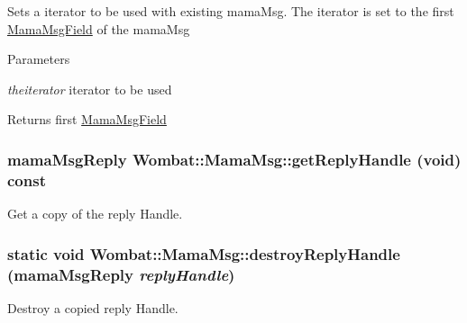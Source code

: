 Sets a iterator to be used with existing mamaMsg. The iterator is set to the first \hyperlink{classWombat_1_1MamaMsgField}{MamaMsgField} of the mamaMsg


\begin{DoxyParams}{Parameters}
\item[{\em theiterator}]iterator to be used \end{DoxyParams}
\begin{DoxyReturn}{Returns}
first \hyperlink{classWombat_1_1MamaMsgField}{MamaMsgField} 
\end{DoxyReturn}
\hypertarget{classWombat_1_1MamaMsg_a27a619720f5b52b966239d02cabf63b0}{
\subsubsection[{getReplyHandle}]{\setlength{\rightskip}{0pt plus 5cm}mamaMsgReply Wombat::MamaMsg::getReplyHandle (void) const}}
\label{classWombat_1_1MamaMsg_a27a619720f5b52b966239d02cabf63b0}


Get a copy of the reply Handle. \hypertarget{classWombat_1_1MamaMsg_ae57b68a19d23621e6fb7fc71c2f006cf}{
\subsubsection[{destroyReplyHandle}]{\setlength{\rightskip}{0pt plus 5cm}static void Wombat::MamaMsg::destroyReplyHandle (mamaMsgReply {\em replyHandle})}}
\label{classWombat_1_1MamaMsg_ae57b68a19d23621e6fb7fc71c2f006cf}


Destroy a copied reply Handle. 